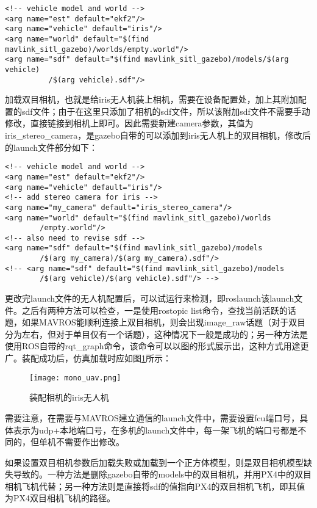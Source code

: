 \begin{verbatim}
<!-- vehicle model and world -->
<arg name="est" default="ekf2"/>
<arg name="vehicle" default="iris"/>
<arg name="world" default="$(find mavlink_sitl_gazebo)/worlds/empty.world"/>
<arg name="sdf" default="$(find mavlink_sitl_gazebo)/models/$(arg vehicle)
          /$(arg vehicle).sdf"/>
\end{verbatim}

加载双目相机，也就是给iris无人机装上相机，需要在设备配置处，加上其附加配置的sdf文件；由于在这里只添加了相机的sdf文件，所以该附加sdf文件不需要手动修改，直接链接到相机上即可。因此需要新建camera参数，其值为iris\_stereo\_camera，是gazebo自带的可以添加到iris无人机上的双目相机，修改后的launch文件部分如下：

\begin{verbatim}
<!-- vehicle model and world -->
<arg name="est" default="ekf2"/>
<arg name="vehicle" default="iris"/>
<!-- add stereo camera for iris -->
<arg name="my_camera" default="iris_stereo_camera"/>
<arg name="world" default="$(find mavlink_sitl_gazebo)/worlds
        /empty.world"/>
<!-- also need to revise sdf -->
<arg name="sdf" default="$(find mavlink_sitl_gazebo)/models
        /$(arg my_camera)/$(arg my_camera).sdf"/>
<!-- <arg name="sdf" default="$(find mavlink_sitl_gazebo)/models
        /$(arg vehicle)/$(arg vehicle).sdf"/> -->
\end{verbatim}

更改完launch文件的无人机配置后，可以试运行来检测，即roslaunch该launch文件。之后有两种方法可以检查，一是使用rostopic list命令，查找当前活跃的话题，如果MAVROS能顺利连接上双目相机，则会出现image\_raw话题（对于双目分为左右，但对于单目仅有一个话题），这种情况下一般是成功的；另一种方法是使用ROS自带的rqt\_graph命令，该命令可以以图的形式展示出，这种方式用途更广。装配成功后，仿真加载时应如图\ref{fig4-2}所示：


\begin{figure}[!ht]
	\centering
	\texttt{[image: mono\_uav.png]}
	\caption{装配相机的iris无人机}
	\label{fig4-2}
\end{figure}

需要注意，在需要与MAVROS建立通信的launch文件中，需要设置fcu端口号，具体表示为udp+本地端口号，在多机的launch文件中，每一架飞机的端口号都是不同的，但单机不需要作出修改。

如果设置双目相机参数后加载失败或加载到一个正方体模型，则是双目相机模型缺失导致的。一种方法是删除gazebo自带的models中的双目相机，并用PX4中的双目相机飞机代替；另一种方法则是直接将sdf的值指向PX4的双目相机飞机，即其值为PX4双目相机飞机的路径。

